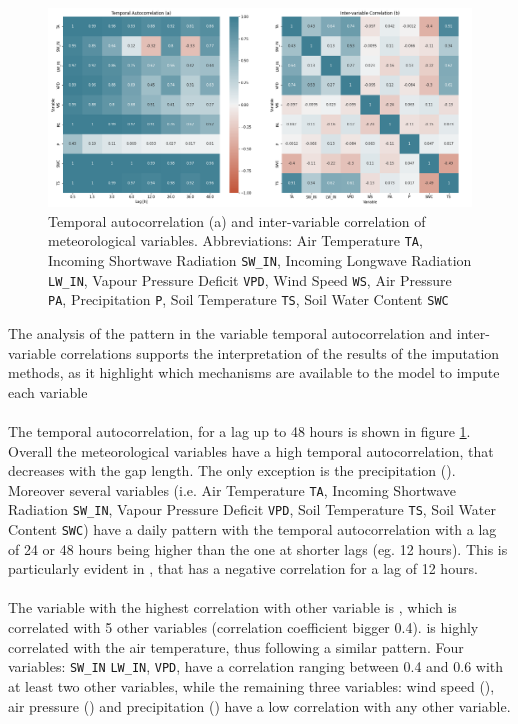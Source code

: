 \documentclass{article}
\begin{document}
\begin{figure}
    \centerline{\includegraphics[width=7in]{images2/correlation}}
    \caption{Temporal autocorrelation (a) and inter-variable correlation of meteorological variables.  Abbreviations: Air Temperature \texttt{TA}, Incoming Shortwave Radiation \texttt{SW\_IN}, Incoming Longwave Radiation \texttt{LW\_IN}, Vapour Pressure Deficit \texttt{VPD}, Wind Speed \texttt{WS}, Air Pressure \texttt{PA}, Precipitation \texttt{P}, Soil Temperature \texttt{TS}, Soil Water Content \texttt{SWC}}
    \label{fig:correlation}
\end{figure}

The analysis of the pattern in the variable temporal autocorrelation and inter-variable correlations supports the interpretation of the results of the imputation methods, as it highlight which mechanisms are available to the model to impute each variable

\paragraph{} The temporal autocorrelation, for a lag up to 48 hours is shown in figure \ref{fig:correlation}. Overall the meteorological variables have a high temporal autocorrelation, that decreases with the gap length. The only exception is the precipitation (). Moreover several variables (i.e. Air Temperature \texttt{TA}, Incoming Shortwave Radiation \texttt{SW\_IN},  Vapour Pressure Deficit \texttt{VPD}, Soil Temperature \texttt{TS}, Soil Water Content \texttt{SWC}) have a daily pattern with the temporal autocorrelation with a lag of 24 or 48 hours being higher than the one at shorter lags (eg. 12 hours). This is particularly evident in , that has a negative correlation for a lag of 12 hours.

\paragraph{} The variable with the highest correlation with other variable is , which is correlated with 5 other variables (correlation coefficient bigger 0.4).  is highly correlated with the air temperature, thus following a similar pattern. Four variables: \texttt{SW\_IN} \texttt{LW\_IN}, \texttt{VPD},  have a correlation ranging between 0.4 and 0.6 with at least two other variables, while the remaining three variables: wind speed (), air pressure () and precipitation () have a low correlation with any other variable.  
\end{document}

